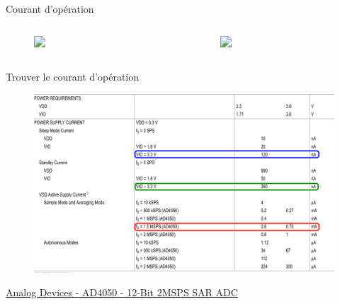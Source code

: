 \begin{frame}{Courant d'opération}
\begin{columns}
         {
        \begin{column}{0.45\textwidth}
            \begin{figure}
                \includegraphics<2>[width=\textwidth, height=0.75\textheight, keepaspectratio]{pictures/switching-efficiency-curve.png}
            \end{figure}
        \end{column}
        }
         {
        \begin{column}{0.33\textwidth}
            \begin{figure}
                \includegraphics<3>[width=\textwidth, height=0.75\textheight, keepaspectratio]{pictures/switching-efficiency-curve.png}
            \end{figure}
        \end{column}
        }
    \end{columns}
\end{frame}

\begin{frame}{Trouver le courant d'opération}
    \begin{figure}
        \includegraphics[width=\textwidth, height=0.75\textheight, keepaspectratio]{pictures/ad4050-power.png}
    \end{figure}
    \href{https://www.analog.com/media/en/technical-documentation/data-sheets/ad4050-ad4056.pdf}{Analog Devices - AD4050 - 12-Bit 2MSPS SAR ADC}
\end{frame}

